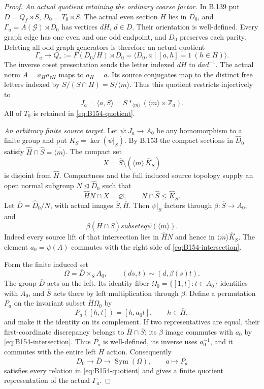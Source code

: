 \begin{proof}
\emph{An actual quotient retaining the ordinary coarse factor.}
In B.139 put $D=Q_f\rtimes S$, $D_0=T_0\rtimes S$.
The actual even section $H$ lies in $D_0$, and
$\Gamma_a=A(\mathcal G)\rtimes D_0$ has vertices $dH$, $d\in D$.
Their orientation is well-defined. Every graph edge has one even and
one odd endpoint, and $D_0$ preserves each parity. Deleting all odd
graph generators is therefore an actual quotient
\begin{equation}\label{eq:B154-quotient}
 \Gamma_a\longrightarrow Q_*:=F(D_0/H)\rtimes D_0
   =\langle D_0,a\mid[a,h]=1\ (h\in H)\rangle.
\end{equation}
The inverse coset presentation sends the letter indexed $dH$ to
$dad^{-1}$. The actual norm $A=a_Ha_{\tau H}$ maps to $a_H=a$.
Its source conjugates map to the distinct free letters indexed by
$S/(S\cap H)=S/\langle m\rangle$. Thus this quotient restricts
injectively to
\[
 J_a=\langle a,S\rangle
    =S*_{\langle m\rangle}(\langle m\rangle\times\mathbb Z_a).
\]
All of $T_0$ is retained in \eqref{eq:B154-quotient}.

\emph{An arbitrary finite source target.}
Let $\psi:J_a\to A_0$ be any homomorphism to a finite group and put
$K_S=\ker(\psi|_S)$. By B.153 the compact sections in
$\widehat D_0$ satisfy
$\widehat H\cap\widehat S=\overline{\langle m\rangle}$.
The compact set
\[
 X=\widehat S\setminus
       (\overline{\langle m\rangle}\,\widehat K_S)
\]
is disjoint from $\widehat H$. Compactness and the full induced
source topology supply an open normal subgroup $N\trianglelefteq
\widehat D_0$ such that
\[
 \widehat HN\cap X=\varnothing,
 \qquad N\cap\widehat S\le\widehat K_S.
\]
Let $\overline D=\widehat D_0/N$, with actual images
$\overline S,\overline H$. Then $\psi|_S$ factors through
$\beta:\overline S\to A_0$, and
\begin{equation}\label{eq:B154-intersection}
 \beta(\overline H\cap\overline S)subseteq\psi(\langle m\rangle).
\end{equation}
Indeed every source lift of that intersection lies in $\widehat HN$
and hence in $\overline{\langle m\rangle}\widehat K_S$.
The element $a_0=\psi(A)$ commutes with the right side of
\eqref{eq:B154-intersection}.

Form the finite induced set
\[
 \Omega=\overline D\times_{\overline S}A_0,
 \qquad(ds,t)\sim(d,\beta(s)t).
\]
The group $\overline D$ acts on the left. Its identity fiber
$\Omega_0=\{[1,t]:t\in A_0\}$ identifies with $A_0$, and
$\overline S$ acts there by left multiplication through $\beta$.
Define a permutation $P_a$ on the invariant subset
$\overline H\Omega_0$ by
\[
 P_a([h,t])=[h,a_0t],\qquad h\in\overline H,
\]
and make it the identity on its complement. If two representatives
are equal, their first-coordinate discrepancy belongs to
$\overline H\cap\overline S$; its $\beta$ image commutes with $a_0$
by \eqref{eq:B154-intersection}. Thus $P_a$ is well-defined, its
inverse uses $a_0^{-1}$, and it commutes with the entire left
$\overline H$ action. Consequently
\[
 D_0\longrightarrow\overline D\longrightarrow\operatorname{Sym}(\Omega),
 \qquad a\longmapsto P_a
\]
satisfies every relation in \eqref{eq:B154-quotient} and gives a finite
quotient representation of the actual $\Gamma_a$.


\end{proof}

